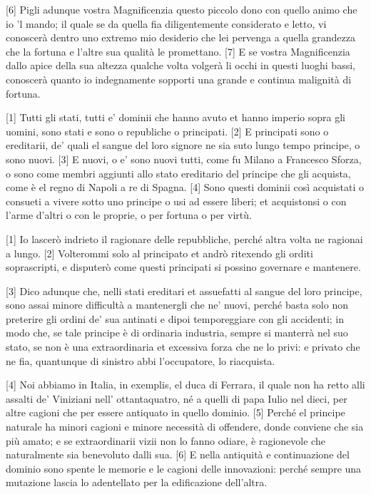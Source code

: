 {[}6{]} Pigli adunque vostra Magnificenzia questo piccolo dono con
quello animo che io 'l mando; il quale se da quella fia diligentemente
considerato e letto, vi conoscerà dentro uno extremo mio desiderio che
lei pervenga a quella grandezza che la fortuna e l'altre sua qualità le
promettano. {[}7{]} E se vostra Magnificenzia dallo apice della sua
altezza qualche volta volgerà li occhi in questi luoghi bassi, conoscerà
quanto io indegnamente sopporti una grande e continua malignità di
fortuna.

\setcounter{secnumdepth}{4}


{[}1{]} Tutti gli stati, tutti e' dominii che hanno avuto et hanno
imperio sopra gli uomini, sono stati e sono o republiche o principati.
{[}2{]} E principati sono o ereditarii, de' quali el sangue del loro
signore ne sia suto lungo tempo principe, o sono nuovi. {[}3{]} E nuovi,
o e' sono nuovi tutti, come fu Milano a Francesco Sforza, o sono come
membri aggiunti allo stato ereditario del principe che gli acquista,
come è el regno di Napoli a re di Spagna. {[}4{]} Sono questi dominii
così acquistati o consueti a vivere sotto uno principe o usi ad essere
liberi; et acquistonsi o con l'arme d'altri o con le proprie, o per
fortuna o per virtù.


{[}1{]} Io lascerò indrieto il ragionare delle repubbliche, perché altra
volta ne ragionai a lungo. {[}2{]} Volterommi solo al principato et
andrò ritexendo gli orditi soprascripti, e disputerò come questi
principati si possino governare e mantenere.

{[}3{]} Dico adunque che, nelli stati ereditari et assuefatti al sangue
del loro principe, sono assai minore difficultà a mantenergli che ne'
nuovi, perché basta solo non preterire gli ordini de' sua antinati e
dipoi temporeggiare con gli accidenti; in modo che, se tale principe è
di ordinaria industria, sempre si manterrà nel suo stato, se non è una
extraordinaria et excessiva forza che ne lo privi: e privato che ne fia,
quantunque di sinistro abbi l'occupatore, lo riacquista.

{[}4{]} Noi abbiamo in Italia, in exemplis, el duca di Ferrara, il quale
non ha retto alli assalti de' Viniziani nell' ottantaquatro, né a quelli
di papa Iulio nel dieci, per altre cagioni che per essere antiquato in quello dominio. {[}5{]} Perché el
principe naturale ha minori cagioni e minore necessità di offendere,
donde conviene che sia più amato; e se extraordinarii vizii non lo fanno
odiare, è ragionevole che naturalmente sia benevoluto dalli sua. {[}6{]}
E nella antiquità e continuazione del dominio sono spente le memorie e
le cagioni delle innovazioni: perché sempre una mutazione lascia lo
adentellato per la edificazione dell'altra.

